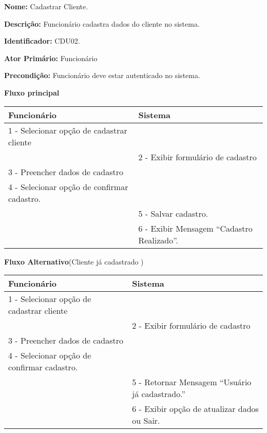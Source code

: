 \par
\textbf{Nome:} Cadastrar Cliente.
\par
\textbf{Descrição:} Funcionário cadastra dados do cliente no sistema.
\par 
\textbf{Identificador:} CDU02.
\par
\textbf{Ator Primário:} Funcionário	
\par
\textbf{Precondição:} Funcionário deve estar autenticado no sistema.
\par
\par
\textbf{Fluxo principal}\par
\begin{tabular}{|p{7cm}|p{7cm}|}
	\hline 
	Funcionário & Sistema \\ 
	\hline 	
	1 - Selecionar opção de cadastrar cliente &  \\ 
	\hline 
	& 
	
	2 - Exibir formulário de cadastro 
	\\ 
	\hline 
	3 - Preencher dados de cadastro
	& 		
	
	\\ 
	\hline 
	4 - Selecionar opção de confirmar cadastro.
	& 
	
	\\ 
	\hline 
	& 	
	
	5 - Salvar cadastro. 	
	\\ 
	\hline 
	& 
	
	6 - Exibir Mensagem “Cadastro Realizado”.
	\\ 		
	\hline 
\end{tabular} 

\par
\textbf{Fluxo Alternativo}(Cliente já cadastrado )\par
\begin{tabular}{|p{7cm}|p{7cm}|}
	\hline 
	Funcionário & Sistema \\ 
	\hline 	
	1 - Selecionar opção de cadastrar cliente &  \\ 
	\hline 
	& 
	
	2 - Exibir formulário de cadastro 
	\\ 
	\hline 
	3 - Preencher dados de cadastro
	& 		
	
	\\ 
	\hline 
	4 - Selecionar opção de confirmar cadastro.
	& 
	
	\\ 
	\hline 
	& 	
	
	5 - Retornar Mensagem “Usuário já cadastrado.”	
	\\ 
	\hline 
	& 
	
	6 - Exibir opção de atualizar dados  ou Sair.
	\\ 		
	\hline 
\end{tabular}


